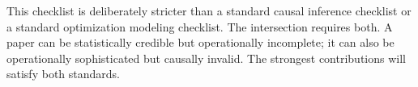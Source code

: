 \documentclass[11pt]{article}
\begin{document}
This checklist is deliberately stricter than a standard causal inference checklist or a standard optimization modeling checklist. The intersection requires both. A paper can be statistically credible but operationally incomplete; it can also be operationally sophisticated but causally invalid. The strongest contributions will satisfy both standards.



\end{document}
